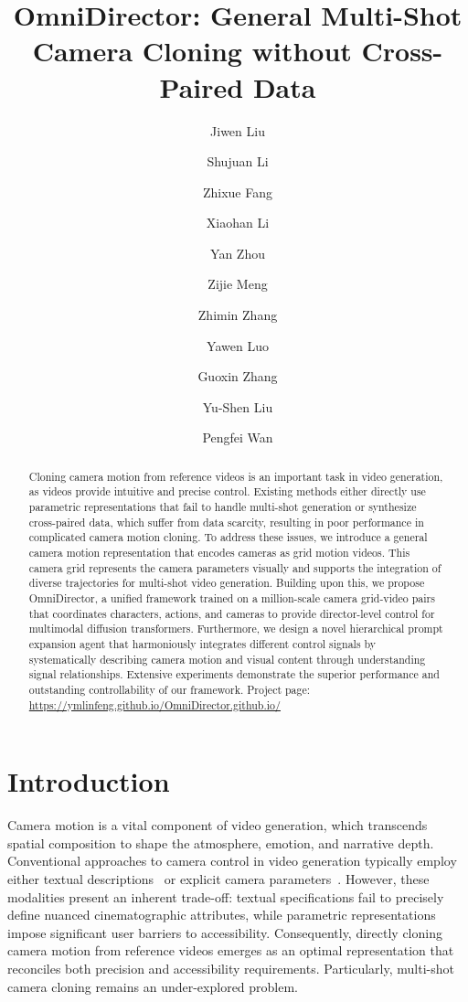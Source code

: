 \documentclass{llmxive}
\title{OmniDirector: General Multi-Shot Camera Cloning without Cross-Paired Data}
\author{Jiwen Liu \and Shujuan Li \and Zhixue Fang \and Xiaohan Li \and Yan Zhou \and Zijie Meng \and Zhimin Zhang \and Yawen Luo \and Guoxin Zhang \and Yu-Shen Liu \and Pengfei Wan}
\begin{document}
\maketitle
\begin{abstract}
\vspace{-0.3cm}
Cloning camera motion from reference videos is an important task in video generation, as videos provide intuitive and precise control. Existing methods either directly use parametric representations that fail to handle multi-shot generation or synthesize cross-paired data, which suffer from data scarcity, resulting in poor performance in complicated camera motion cloning.
To address these issues, we introduce a general camera motion representation that encodes cameras as grid motion videos. This camera grid represents the camera parameters visually and supports the integration of diverse trajectories for multi-shot video generation.
Building upon this, we propose OmniDirector, a unified framework trained on a million-scale camera grid-video pairs that coordinates characters, actions, and cameras to provide director-level control for multimodal diffusion transformers. 
Furthermore, we design a novel hierarchical prompt expansion agent that harmoniously integrates different control signals by systematically describing camera motion and visual content through understanding signal relationships. Extensive experiments demonstrate the superior performance and outstanding controllability of our framework. Project page:  {\url{https://ymlinfeng.github.io/OmniDirector.github.io/}}%
\end{abstract}
\section{Introduction}
Camera motion is a vital component of video generation, which transcends spatial composition to shape the atmosphere, emotion, and narrative depth.
Conventional approaches to camera control in video generation typically employ either textual descriptions~\cite{wang2026multishotmaster,luo2026shotstream} or explicit camera parameters~\cite{he2024cameractrl, bai2025recammaster,wang2025cinemaster,meng2026make}. However, these modalities present an inherent trade-off: textual specifications fail to precisely define nuanced cinematographic attributes, while parametric representations impose significant user barriers to accessibility. Consequently, directly cloning camera motion from reference videos emerges as an optimal representation that reconciles both precision and accessibility requirements. Particularly, multi-shot camera cloning remains an under-explored problem.
\end{document}
